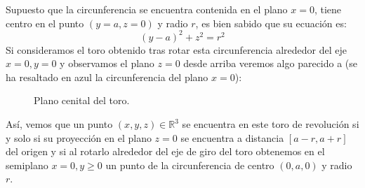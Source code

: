 \begin{ejemplo}
\begin{enumerate}
\begin{figure}[H]
            \end{figure}
            \noindent
            Supuesto que la circunferencia se encuentra contenida en el plano $x=0$, tiene centro en el punto $(y=a,z=0)$ y radio $r$, es bien sabido que su ecuación es:
            \begin{equation}\label{eq:ec_circf}
                {(y-a)}^{2}+z^2 = r^2
            \end{equation}
            Si consideramos el toro obtenido tras rotar esta circunferencia alrededor del eje $x=0,y=0$ y observamos el plano $z=0$ desde arriba veremos algo parecido a (se ha resaltado en azul la circunferencia del plano $x=0$):
            \begin{figure}[H]
                \centering
                \caption{Plano cenital del toro.}\label{fig:cenital_toro}
            \end{figure}
            \noindent
            Así, vemos que un punto $(x,y,z)\in \mathbb{R}^3$ se encuentra en este toro de revolución si y solo si su proyección en el plano $z=0$ se encuentra a distancia $[a-r,a+r]$ del origen y si al rotarlo alrededor del eje de giro del toro obtenemos en el semiplano $x=0,y\geq 0$ un punto de la circunferencia de centro $(0,a,0)$ y radio $r$. \\


\end{enumerate}
\end{ejemplo}

